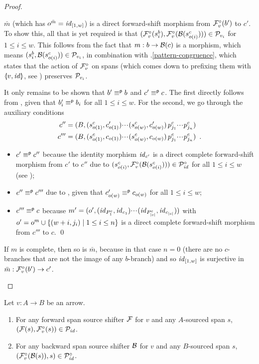 \begin{proof}
\begin{enumerate}[topsep=\smallskipamount]
\smallskip
$\bar m$ (which has $o^{\bar m}=\mathit{id}_{[1,w]}$) is a direct forward-shift morphism from $\mathcal{F}^\circ_{v}(b')$ to $c'$. To show this, all that is yet required is that $(\mathcal{F}^\circ_{v}(s^b_i),\mathcal{F}^\circ_{v}(\mathcal{B}(s^c_{o(i)}))) \in \mathcal{P}_{v_i}$ for $1\leq i\leq w$. This follows from the fact that $m:b\to \mathcal{B}(c)$ is a morphism, which means $(s^b_i,\mathcal{B}(s^c_{o(i)}))\in \mathcal{P}_{v_i}$, in combination with .\ref{pattern-congruence}, which states that the action of $\mathcal{F}^\circ_{v}$ on spans (which comes down to prefixing them with $\spanof{v}{\id}$, see ) preserves $\mathcal{P}_{v_i}$.

\smallskip
It only remains to be shown that $b'\equiv^{\mathsf p} b$ and $c'\equiv^{\mathsf p} c$. The first directly follows from , given that $b'_i\equiv^{\mathsf p} b_i$ for all $1\leq i\leq w$. For the second, we go through the auxiliary conditions
\begin{align*}
c''=\;&(B,(s^c_{o(1)},c'_{o(1)}){\cdotp\mkern-2mu\cdotp\mkern-2mu\cdotp\mkern1mu} (s^c_{o(w)},c'_{o(w)})\,p^c_{j_1}{\cdotp\mkern-2mu\cdotp\mkern-2mu\cdotp\mkern1mu} p^c_{j_n}) \\
c'''=\;&(B,(s^c_{o(1)},c_{o(1)}){\cdotp\mkern-2mu\cdotp\mkern-2mu\cdotp\mkern1mu} (s^c_{o(w)},c_{o(w)})\,p^c_{j_1}{\cdotp\mkern-2mu\cdotp\mkern-2mu\cdotp\mkern1mu} p^c_{j_n}) \enspace.
\end{align*}
\begin{itemize}
\item $c'\equiv^{\mathsf p} c''$ because the identity morphism $\mathit{id}_{c'}$ is a direct complete forward-shift morphism from $c'$ to $c''$ due to $(s^c_{o(i)},\mathcal{F}^\circ_{v}(\mathcal{B}(s^c_{o(i)})))\in \mathcal{P}^\circ_{\mathit{id}}$ for all $1\leq i\leq w$ (see );
\item $c''\equiv^{\mathsf p} c'''$ due to , given that $c'_{o(w)}\equiv^{\mathsf p} c_{o(w)}$ for all $1\leq i\leq w$; 
\item $c'''\equiv^{\mathsf p} c$ because $m'=(o',(\mathit{id}_{P^c_1},\mathit{id}_{c_1}){\cdotp\mkern-2mu\cdotp\mkern-2mu\cdotp\mkern1mu} (\mathit{id}_{P^c_{|c|}},\mathit{id}_{c_{|c|}}))$ with $o'=o^m\cup\{{(w+i,j_i) \mid 1\leq i\leq n}\}$ is a direct complete forward-shift morphism from $c'''$ to $c$.
\qed
\end{itemize}
If $m$ is complete, then so is $\bar m$, because in that case $n=0$ (there are no $c$-branches that are not the image of any $b$-branch) and so $\mathit{id}_{[1,w]}$ is surjective in $\bar m:\mathcal{F}^\circ_{v}(b')\to c'$.
\end{enumerate}
\end{proof}
%
\begin{lemma}
Let $v:A\to B$ be an arrow.
\begin{enumerate}[topsep=\smallskipamount]
\item For any forward span source shifter $\mathcal{F}$ for $v$ and any $A$-sourced span $s$, $(\mathcal{F}(s),\mathcal{F}^\circ_{v}(s))\in \mathcal{P}_{\mathit{id}}$.
\item For any backward span source shifter $\mathcal{B}$ for $v$ and any $B$-sourced span $s$, $(\mathcal{F}^\circ_{v}(\mathcal{B}(s)),s)\in \mathcal{P}^\circ_{\mathit{id}}$.
\end{enumerate}
\end{lemma}
